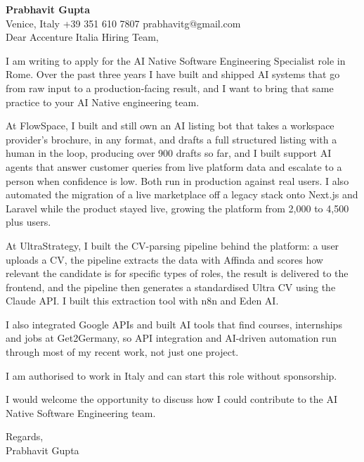 \documentclass[a4paper,10.5pt]{article}
\begin{document}
\textbf{Prabhavit Gupta}\\
Venice, Italy \textbar{} +39 351 610 7807 \textbar{} prabhavitg@gmail.com\\[10pt]
Dear Accenture Italia Hiring Team,

I am writing to apply for the AI Native Software Engineering Specialist role in Rome. Over the past three years I have built and shipped AI systems that go from raw input to a production-facing result, and I want to bring that same practice to your AI Native engineering team.

At FlowSpace, I built and still own an AI listing bot that takes a workspace provider's brochure, in any format, and drafts a full structured listing with a human in the loop, producing over 900 drafts so far, and I built support AI agents that answer customer queries from live platform data and escalate to a person when confidence is low. Both run in production against real users. I also automated the migration of a live marketplace off a legacy stack onto Next.js and Laravel while the product stayed live, growing the platform from 2,000 to 4,500 plus users.

At UltraStrategy, I built the CV-parsing pipeline behind the platform: a user uploads a CV, the pipeline extracts the data with Affinda and scores how relevant the candidate is for specific types of roles, the result is delivered to the frontend, and the pipeline then generates a standardised Ultra CV using the Claude API. I built this extraction tool with n8n and Eden AI.

I also integrated Google APIs and built AI tools that find courses, internships and jobs at Get2Germany, so API integration and AI-driven automation run through most of my recent work, not just one project.

I am authorised to work in Italy and can start this role without sponsorship.

I would welcome the opportunity to discuss how I could contribute to the AI Native Software Engineering team.

Regards,\\
Prabhavit Gupta
\end{document}
